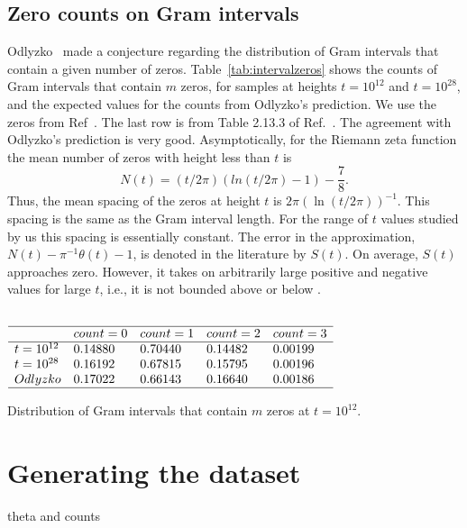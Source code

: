 \documentclass[journal]{IEEEtai}
\begin{document}
\subsection{\label{seccounts}Zero counts on Gram intervals}
 Odlyzko~\cite{Odlyzko 1992} made a conjecture regarding the distribution of Gram intervals that contain a given number of zeros. 
Table~\ref{tab:intervalzeros} shows the counts of Gram intervals that contain $m$ zeros, for samples at heights  $t=10^{12}$ and $t=10^{28}$, and the  expected values for the counts from Odlyzko's prediction. We use the zeros from Ref~\cite{hiary 2010}. The last row is from Table 2.13.3 of Ref.~\cite{Odlyzko 1992}. The agreement with Odlyzko's prediction is very good. 
Asymptotically, for the Riemann zeta function the mean number of 
zeros with height less than $t$ 
is~\cite{Edwards(1974)}
\begin{equation}  
N (t) = (t/2\pi)(ln(t/2\pi)-1)-\frac{7}{8}.
\label{eq:Rnumber}
\end{equation}
Thus, the mean spacing of the zeros at height $t$ is 
$2\pi(\ln (t/2\pi))^{-1}$. This spacing is the same as the Gram interval length. For the range of $t$ values
studied by us this spacing is essentially constant.
The error in the approximation, $N (t) - \pi^{-1}\theta(t) -1$, is denoted in the literature by $S(t)$. On average, $S(t)$ approaches zero. However, it takes on arbitrarily large positive and negative values for large $t$, i.e., it is not bounded above or below \cite{Selberg}.

\begin{table}
\centering \(\begin{array}{lllll}\\
\hline
 &count = 0&count = 1&count = 2&count = 3\\
\hline
t = 10^{12}&0.14880&0.70440&0.14482&0.00199\\
t = 10^{28}&0.16192&0.67815&0.15795&0.00196\\
Odlyzko&0.17022&0.66143&0.16640&0.00186\\
\hline
\end{array}\)
\caption{Distribution of Gram intervals that contain $m$ zeros at  $t=10^{12}$.} 
\label{tab:intervalzeros}
\end{table}


\section{Generating the dataset}

theta and counts
\end{document}
